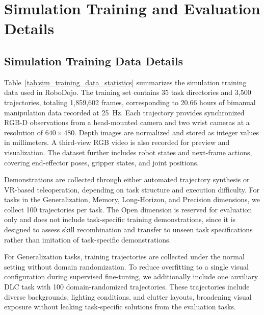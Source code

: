 \section{Simulation Training and Evaluation Details}

\subsection{Simulation Training Data Details}
\label{appendix:sim_training_data_statistics}

Table~\ref{tab:sim_training_data_statistics} summarizes the simulation training data used in RoboDojo. The training set contains 35 task directories and 3,500 trajectories, totaling 1,859,602 frames, corresponding to 20.66 hours of bimanual manipulation data recorded at 25~Hz. Each trajectory provides synchronized RGB-D observations from a head-mounted camera and two wrist cameras at a resolution of $640 \times 480$. Depth images are normalized and stored as integer values in millimeters. A third-view RGB video is also recorded for preview and visualization. The dataset further includes robot states and next-frame actions, covering end-effector poses, gripper states, and joint positions.

Demonstrations are collected through either automated trajectory synthesis or VR-based teleoperation, depending on task structure and execution difficulty. For tasks in the Generalization, Memory, Long-Horizon, and Precision dimensions, we collect 100 trajectories per task. The Open dimension is reserved for evaluation only and does not include task-specific training demonstrations, since it is designed to assess skill recombination and transfer to unseen task specifications rather than imitation of task-specific demonstrations.

For Generalization tasks, training trajectories are collected under the normal setting without domain randomization. To reduce overfitting to a single visual configuration during supervised fine-tuning, we additionally include one auxiliary DLC task with 100 domain-randomized trajectories. These trajectories include diverse backgrounds, lighting conditions, and clutter layouts, broadening visual exposure without leaking task-specific solutions from the evaluation tasks.

